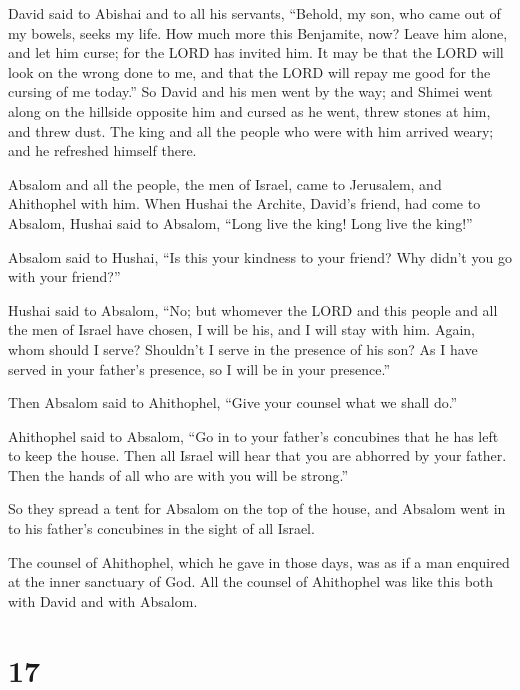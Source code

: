  David said to Abishai and to all his servants, ``Behold,
my son, who came out of my bowels, seeks my life. How much more this
Benjamite, now? Leave him alone, and let him curse; for the LORD has
invited him.  It may be that the LORD will look on the
wrong done to me, and that the LORD will repay me good for the cursing
of me today.''  So David and his men went by the way; and
Shimei went along on the hillside opposite him and cursed as he went,
threw stones at him, and threw dust.  The king and all
the people who were with him arrived weary; and he refreshed himself
there.

 Absalom and all the people, the men of Israel, came to
Jerusalem, and Ahithophel with him.  When Hushai the
Archite, David's friend, had come to Absalom, Hushai said to Absalom,
``Long live the king! Long live the king!''

 Absalom said to Hushai, ``Is this your kindness to your
friend? Why didn't you go with your friend?''

 Hushai said to Absalom, ``No; but whomever the LORD and
this people and all the men of Israel have chosen, I will be his, and I
will stay with him.  Again, whom should I serve?
Shouldn't I serve in the presence of his son? As I have served in your
father's presence, so I will be in your presence.''

 Then Absalom said to Ahithophel, ``Give your counsel
what we shall do.''

 Ahithophel said to Absalom, ``Go in to your father's
concubines that he has left to keep the house. Then all Israel will hear
that you are abhorred by your father. Then the hands of all who are with
you will be strong.''

 So they spread a tent for Absalom on the top of the
house, and Absalom went in to his father's concubines in the sight of
all Israel.

 The counsel of Ahithophel, which he gave in those days,
was as if a man enquired at the inner sanctuary of God. All the counsel
of Ahithophel was like this both with David and with Absalom.

\hypertarget{section-16}{%
\section{17}\label{section-16}}

